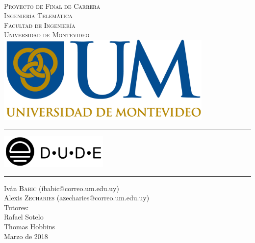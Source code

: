 \begin{titlepage}
	\begin{center}

		\textsc{\LARGE}\\[0.5cm]
		\textsc{\LARGE Proyecto de Final de Carrera}\\[1.0cm]

		\textsc{\Large Ingeniería Telemática}\\[0.2cm]
		\textsc{\Large Facultad de Ingeniería}\\[0.2cm]
		\textsc{\Large Universidad de Montevideo}\\[1.0cm]
		\includegraphics[width=0.8\textwidth]{images/logo-um}
		

		
		\begin{center}
		\rule{\textwidth}{.6pt}
		\end{center}

		\includegraphics[width=0.4\textwidth, keepaspectratio]{images/logo-dude-negro}
		
		\begin{center}
		\rule{\textwidth}{.6pt}
		\end{center}

		{\Large Iván \textsc{Babic}} {\small (ibabic@correo.um.edu.uy)}\\
		{\Large Alexis \textsc{Zecharies}} {\small (azecharies@correo.um.edu.uy)}\\[1.0cm]

		{\small Tutores:}\\
		{\normalsize Rafael Sotelo}\\
		{\normalsize Thomas Hobbins}\\[0.5cm]

		Marzo de 2018\\

		\vfill

	\end{center}
\end{titlepage}
